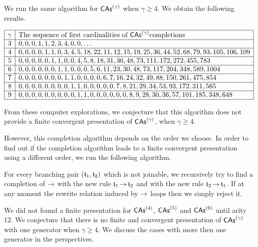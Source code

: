 We run the same algorithm for $\mathsf{CAs}^{\left(\gamma\right)}$ when $\gamma \geq 4$.
We obtain the following results.

\begin{center}
  \begin{math} \label{arr:completions_CAs}
    \begin{array}{|c|l|} 
      \hline
      \gamma & \mbox{The sequence of first cardinalities of } 
       \mathsf{CAs}^{\left(\gamma\right)} \mbox{completions}\\ \hline
      3 & 0, 0, 0, 1, 1, 2, 3, 4, 0, 0, \dots \\ \hline
      4 & 0, 0, 0, 0, 1, 1, 0, 3, 4, 5, 18, 22, 11, 12, 15, 19, 25, 36,
       44, 52, 68, 79, 93, 105, 106, 109 \\ \hline
      5 & 0, 0, 0, 0, 0, 1, 1, 0, 0, 4, 5, 8, 18, 31, 36, 48, 73, 111,
       172, 272, 455, 783 \\ \hline
      6 & 0, 0, 0, 0, 0, 0, 1, 1, 0, 0, 0, 5, 6, 11, 23, 30, 48, 73, 
      117, 204, 348, 589, 1004 \\ \hline
      7 & 0, 0, 0, 0, 0, 0, 0, 1, 1, 0, 0, 0, 0, 6, 7, 16, 24, 32, 49, 
      88, 150, 261, 475, 854\\ \hline
      8 & 0, 0, 0, 0, 0, 0, 0, 0, 1, 1, 0, 0, 0, 0, 0, 7, 8, 21, 29, 
      34, 53, 93, 172, 311, 565\\ \hline
      9 & 0, 0, 0, 0, 0, 0, 0, 0, 0, 1, 1, 0, 0, 0, 0, 0, 0, 8, 9, 28, 
      30, 36, 57, 101, 185, 348, 648\\ \hline
    \end{array}
  \end{math}
\end{center}
\medbreak

From these computer explorations, we conjecture that this algorithm
does not provide a finite convergent presentation of $\mathsf{CAs}^{\left(\gamma\right)}$, 
when $\gamma \ge 4$.

However, this completion algorithm depends on the order we choose.
In order to find out if the completion algorithm leads to a finite 
convergent presentation using a different order, we run the following
algorithm.

For every branching pair $(\mathfrak{t}_1, \mathfrak{t}_2)$ which is not joinable,
we recursively try to find a completion of $\operatorname{\to}$ with
the new rule $\mathfrak{t}_1 \operatorname{\to}  \mathfrak{t}_2$ and with the new rule 
$\mathfrak{t}_2 \operatorname{\to}  \mathfrak{t}_1$. If at any moment the rewrite relation induced by
$\operatorname{\to}$ loops then we simply reject it.

We did not found a finite presentation for $\mathsf{CAs}^{\left(4\right)}$, $\mathsf{CAs}^{\left(5\right)}$ and 
$\mathsf{CAs}^{\left(6\right)}$ until arity $12$. 
We conjecture that there is no finite and convergent presentation
of $\mathsf{CAs}^{\left(\gamma\right)}$ with one generator when $\gamma \geq 4$.
We discuss the cases with more then one generator in the perspectives.
\medbreak

